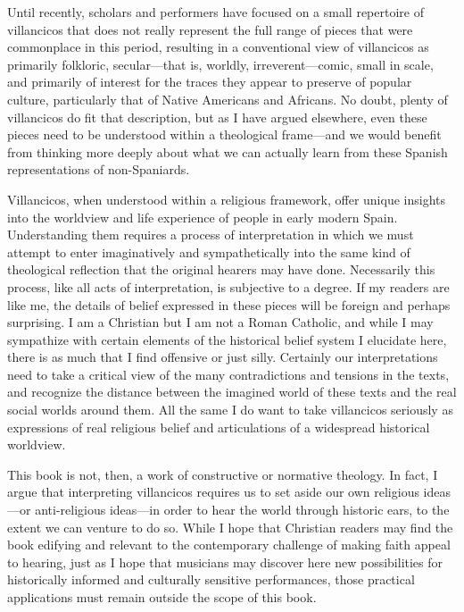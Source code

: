 Until recently, scholars and performers have focused on a small repertoire of
villancicos that does not really represent the full range of pieces
that were commonplace in this period, resulting in a conventional view of
villancicos as primarily folkloric, secular---that is, worldly,
irreverent---comic, small in scale, and primarily of interest for the traces
they appear to preserve of popular culture, particularly that of Native
Americans and Africans.
No doubt, plenty of villancicos do fit that description, but as I have argued
elsewhere, even these pieces need to be understood within a theological
frame---and we would benefit from thinking more deeply about what we can
actually learn from these Spanish representations of non-Spaniards.%
    \Autocite{Cashner:BuildingSociety}

Villancicos, when understood within a religious framework, offer unique
insights into the worldview and life experience of people in early modern
Spain.
Understanding them requires a process of interpretation in which we must
attempt to enter imaginatively and sympathetically into the same kind of
theological reflection that the original hearers may have done.
Necessarily this process, like all acts of interpretation, is subjective to a
degree.
If my readers are like me, the details of belief expressed in these pieces will 
be foreign and perhaps surprising.
I am a Christian but I am not a Roman Catholic, and while I may sympathize with
certain elements of the historical belief system I elucidate here, there is as
much that I find offensive or just silly.
Certainly our interpretations need to take a critical view of the many
contradictions and tensions in the texts, and recognize the distance between
the imagined world of these texts and the real social worlds around them. 
All the same I do want to take villancicos seriously as expressions of real
religious belief and articulations of a widespread historical worldview.

This book is not, then, a work of constructive or normative theology.
In fact, I argue that interpreting villancicos requires us to set aside our own
religious ideas---or anti-religious ideas---in order to hear the world through
historic ears, to the extent we can venture to do so.%
While I hope that Christian readers may find the book edifying and relevant to
the contemporary challenge of making faith appeal to hearing, just as I hope
that musicians may discover here new possibilities for historically informed
and culturally sensitive performances, those practical applications must
remain outside the scope of this book.

